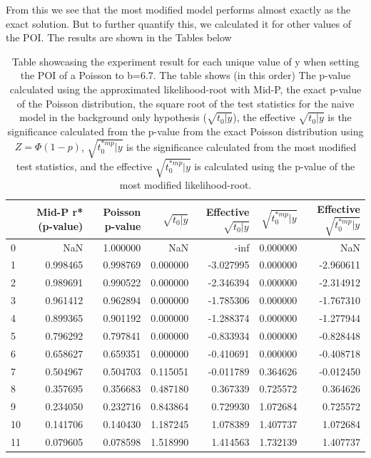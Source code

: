 \documentclass[14pt, a4paper]{article}  %
\begin{document}
\clearpage\noindent From this we see that the most modified model performs almost exactly as the exact solution. But to further quantify this, we calculated it for other values of the POI. The results are shown in the Tables below
\begin{table}[!ht]
    \centering
    \caption{Table showcasing the experiment result for each unique value of y when setting the POI of a Poisson to b=6.7. The table shows (in this order) The p-value calculated using the approximated likelihood-root with Mid-P, the exact p-value of the Poisson distribution, the square root of the test statistics for the naive model in the background only hypothesis ($\sqrt{t_0|y}$), the effective $\sqrt{t_0|y}$ is the significance calculated from the p-value from the exact Poisson distribution using $Z = \Phi(1-p)$, $\sqrt{t_0^{*mp}|y}$ is the significance calculated from the most modified test statistics, and the effective $\sqrt{t_0^{*mp}|y}$ is calculated using the p-value of the most modified likelihood-root.}
    \begin{tabular}{lrrrrrr}
    \toprule
     & Mid-P r* (p-value) & Poisson p-value & $\sqrt{t_0\vert y}$ & Effective $\sqrt{t_0\vert y}$ & $\sqrt{t_0^{*mp}\vert y}$ & Effective $\sqrt{t_0^{*mp}\vert y}$ \\
    \midrule
    0 & NaN & 1.000000 & NaN & -inf & 0.000000 & NaN \\
    1 & 0.998465 & 0.998769 & 0.000000 & -3.027995 & 0.000000 & -2.960611 \\
    2 & 0.989691 & 0.990522 & 0.000000 & -2.346394 & 0.000000 & -2.314912 \\
    3 & 0.961412 & 0.962894 & 0.000000 & -1.785306 & 0.000000 & -1.767310 \\
    4 & 0.899365 & 0.901192 & 0.000000 & -1.288374 & 0.000000 & -1.277944 \\
    5 & 0.796292 & 0.797841 & 0.000000 & -0.833934 & 0.000000 & -0.828448 \\
    6 & 0.658627 & 0.659351 & 0.000000 & -0.410691 & 0.000000 & -0.408718 \\
    7 & 0.504967 & 0.504703 & 0.115051 & -0.011789 & 0.364626 & -0.012450 \\
    8 & 0.357695 & 0.356683 & 0.487180 & 0.367339 & 0.725572 & 0.364626 \\
    9 & 0.234050 & 0.232716 & 0.843864 & 0.729930 & 1.072684 & 0.725572 \\
    10 & 0.141706 & 0.140430 & 1.187245 & 1.078389 & 1.407737 & 1.072684 \\
    11 & 0.079605 & 0.078598 & 1.518990 & 1.414563 & 1.732139 & 1.407737 \\

\end{tabular}
\end{table}
\end{document}
